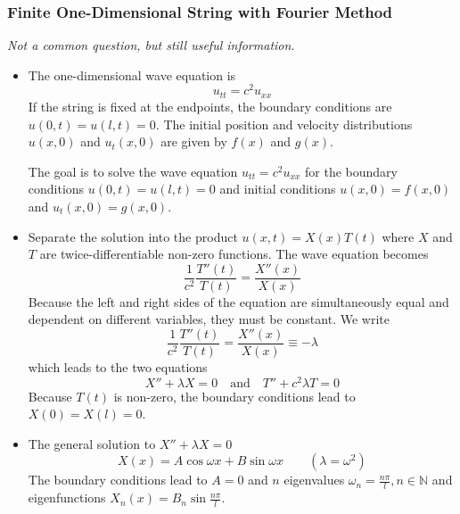 \documentclass[11pt, a4paper]{article}
\newcommand{\question}[1]{\textit{#1}\vspace{2mm}}
\begin{document}
\subsubsection{Finite One-Dimensional String with Fourier Method}
\question{Not a common question, but still useful information.}
\begin{itemize}
	\item The one-dimensional wave equation is
	\begin{equation*}
		u_{tt} = c^2u_{xx}
	\end{equation*}
	If the string is fixed at the endpoints, the boundary conditions are $ u(0, t) = u(l, t) = 0 $. The initial position and velocity distributions $ u(x, 0) $ and $ u_{t}(x, 0) $ are given by $ f(x) $ and $ g(x) $.
	
	The goal is to solve the wave equation $ u_{tt} = c^2u_{xx} $ for the boundary conditions $ u(0, t) = u(l, t) = 0 $ and initial conditions $ u(x, 0) = f(x, 0) $ and $ u_{t}(x, 0) = g(x, 0) $.
	
	\item Separate the solution into the product $ u(x, t) = X(x)T(t) $ where $ X $ and $ T $ are twice-differentiable non-zero functions. The wave equation becomes
	\begin{equation*}
		\frac{1}{c^{2}}\frac{T''(t)}{T(t)} = \frac{X''(x)}{X(x)}
	\end{equation*}
	Because the left and right sides of the equation are simultaneously equal and dependent on different variables, they must be constant. We write
	\begin{equation*}
  		\frac{1}{c^{2}}\frac{T''(t)}{T(t)} = \frac{X''(x)}{X(x)} \equiv - \lambda
  	\end{equation*}
  	which leads to the two equations
  	\begin{equation*}
  		X'' + \lambda X = 0 \quad \text{and} \quad T'' + c^{2}\lambda T = 0
  	\end{equation*}
  	Because $ T(t) $ is non-zero, the boundary conditions lead to $ X(0) = X(l) = 0$. 
  	
  	\item The general solution to $ X'' + \lambda X = 0 $ 
  	\begin{equation*}
  		X(x) = A \cos \omega x + B \sin \omega x \qquad (\lambda = \omega^{2})
  	\end{equation*}
  	The boundary conditions lead to $ A = 0 $ and $ n $ eigenvalues $ \omega_{n} = \frac{n\pi}{l}, n \in \mathbb{N} $ and eigenfunctions $ X_{n}(x) = B_n \sin \frac{n\pi}{l} $.
  	

\end{itemize}
\end{document}
